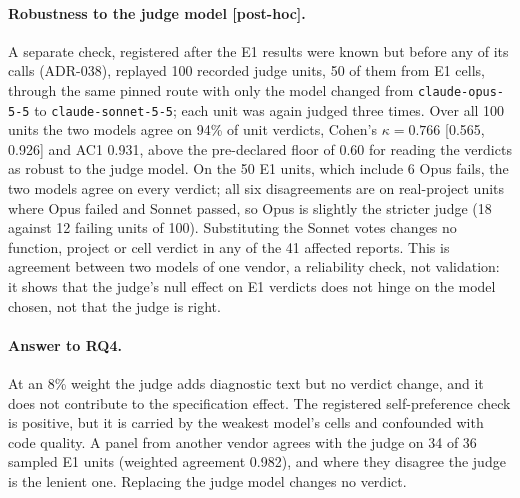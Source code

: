\documentclass[10pt,a4paper]{article}
\newcommand{\ph}{\textsf{\scriptsize[post-hoc]}}    %
\begin{document}
\paragraph{Robustness to the judge model \ph{}.} A separate check, registered after the E1 results were known but
before any of its calls (ADR-038), replayed 100 recorded judge units, 50 of them from E1 cells, through the same
pinned route with only the model changed from \texttt{claude-opus-5-5} to \texttt{claude-sonnet-5-5}; each unit was
again judged three times. Over all 100 units the two models agree on 94\% of unit verdicts, Cohen's
$\kappa = 0.766$ [0.565, 0.926] and AC1 0.931, above the pre-declared floor of 0.60 for reading the verdicts as robust
to the judge model. %
On the 50 E1 units, which include 6 Opus fails, the two models agree on every verdict; all six disagreements are on
real-project units where Opus failed and Sonnet passed, so Opus is slightly the stricter judge (18 against 12 failing
units of 100). Substituting the Sonnet votes changes no function, project or cell verdict in any of the 41 affected
reports. %
This is agreement between two models of one vendor, a reliability check, not validation: it shows that the judge's
null effect on E1 verdicts does not hinge on the model chosen, not that the judge is right.

\paragraph{Answer to RQ4.} At an 8\% weight the judge adds diagnostic text but no verdict change, and it does not
contribute to the specification effect. The registered self-preference check is positive, but it is carried by the
weakest model's cells and confounded with code quality. A panel from another vendor agrees with the judge on 34 of 36
sampled E1 units (weighted agreement 0.982), and where they disagree the judge is the lenient one. Replacing the judge model changes no verdict.
\end{document}
